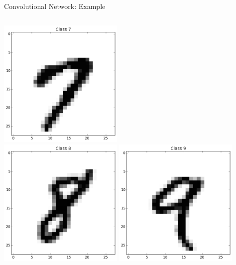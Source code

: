 \documentclass[10pt, aspectratio=169]{beamer} %
\begin{document}
\begin{frame}[fragile]{Convolutional Network: Example}
\begin{columns}
\includegraphics[width=0.45\textwidth]{mnist_7.png}\\
\includegraphics[width=0.45\textwidth]{mnist_8.png}
\includegraphics[width=0.45\textwidth]{mnist_9.png}
\end{columns}
\end{frame}
\end{document}
